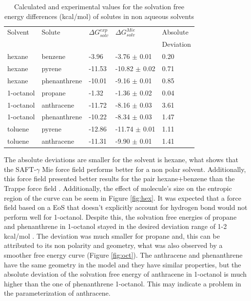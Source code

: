 \begin{table}[h]
\centering
  \caption{Calculated and experimental values for the solvation free energy differences (kcal/mol) of solutes in non aqueous solvents}
  \label{tbl:solv1}
  \begin{tabular}{lllll}
    \hline
      Solvent & Solute & $\Delta G_{solv}^{exp}$ & $\Delta G_{solv}^{Mie}$ & Absolute \\
      & & & &Deviation \\
    \hline
    hexane    & benzene      & -3.96  & -3.76  $\pm$ 0.01 & 0.20 \\
    hexane    & pyrene       & -11.53 & -10.82 $\pm$ 0.02 & 0.71 \\
    hexane    & phenanthrene & -10.01 & -9.16  $\pm$ 0.01 & 0.85 \\
    1-octanol & propane      & -1.32  & -1.36  $\pm$ 0.02 & 0.04 \\
    1-octanol & anthracene   & -11.72 & -8.16  $\pm$ 0.03 & 3.61 \\
    1-octanol & phenanthrene & -10.22 & -8.34  $\pm$ 0.03 & 1.47 \\
    toluene   & pyrene       & -12.86 & -11.74 $\pm$ 0.01 & 1.11\\
    toluene   & anthracene   & -11.31 & -9.90 $\pm$ 0.01 & 1.41\\
    \hline
  \end{tabular}
\end{table}

The absolute deviations are smaller for the solvent is hexane, what shows that the SAFT-$\gamma$ Mie force field performs better for a non polar solvent. Additionally, this force field presented better results for the pair hexane+benzene than the Trappe force field \cite{garrido2011}. Additionally, the effect of molecule's size on the entropic region of the curve can be seem in Figure \ref{fig:hex}. It was expected that a force field based on a EoS that doesn't explicitly account for hydrogen bond would not perform well for 1-octanol. Despite this, the solvation free energies of propane and phenanthrene in 1-octanol stayed in the desired deviation range of 1-2 kcal/mol \cite{doimobley}. The deviation was much smaller for propane and, this can be attributed to its non polarity and geometry, what was also observed by a smoother free energy curve (Figure \ref{fig:oct}). The anthracene and phenanthrene have the same geometry in the model and they have similar properties, but the absolute deviation of the solvation free energy of anthracene in 1-octanol is much higher than the one of phenanthrene 1-octanol. This may indicate a problem in the parameterization of anthracene.     

